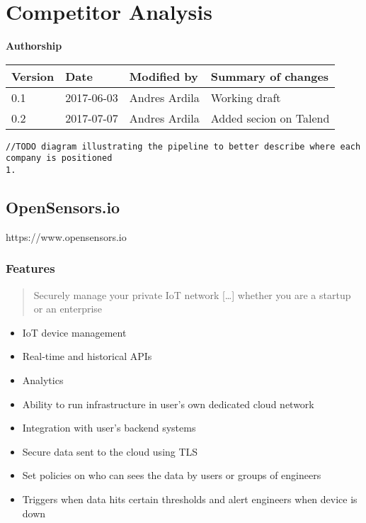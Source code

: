 \section{Competitor Analysis}\label{competitor-analysis}

\textbf{Authorship}

\begin{longtable}[]{@{}llll@{}}
\toprule
Version & Date & Modified by & Summary of changes\tabularnewline
\midrule
\endhead
0.1 & 2017-06-03 & Andres Ardila & Working draft\tabularnewline
0.2 & 2017-07-07 & Andres Ardila & Added secion on Talend\tabularnewline
\bottomrule
\end{longtable}

\begin{verbatim}
//TODO diagram illustrating the pipeline to better describe where each company is positioned
1.
\end{verbatim}

\subsection{OpenSensors.io}\label{opensensors.io}

https://www.opensensors.io

\subsubsection{Features}\label{features}

\begin{quote}
Securely manage your private IoT network {[}\ldots{}{]} whether you are
a startup or an enterprise
\end{quote}

\begin{itemize}
\tightlist
\item
  IoT device management
\item
  Real-time and historical APIs
\item
  Analytics
\item
  Ability to run infrastructure in user's own dedicated cloud network
\item
  Integration with user's backend systems
\item
  Secure data sent to the cloud using TLS
\item
  Set policies on who can sees the data by users or groups of engineers
\item
  Triggers when data hits certain thresholds and alert engineers when
  device is down
\end{itemize}

